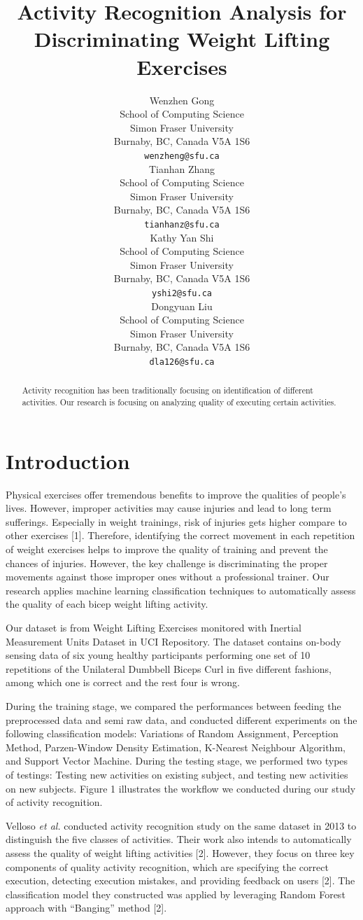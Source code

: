 \documentclass{article} %
\title{Activity Recognition Analysis for Discriminating Weight Lifting Exercises}
\author{
Wenzhen Gong \\
School of Computing Science\\
Simon Fraser University\\
Burnaby, BC, Canada V5A 1S6 \\
\texttt{wenzheng@sfu.ca} \\
\And
Tianhan Zhang \\
School of Computing Science\\
Simon Fraser University\\
Burnaby, BC, Canada V5A 1S6 \\
\texttt{tianhanz@sfu.ca} \\
\AND
Kathy Yan Shi \\
School of Computing Science\\
Simon Fraser University\\
Burnaby, BC, Canada V5A 1S6 \\
\texttt{yshi2@sfu.ca} \\
\And
Dongyuan Liu \\
School of Computing Science\\
Simon Fraser University\\
Burnaby, BC, Canada V5A 1S6 \\
\texttt{dla126@sfu.ca} \\
}
\begin{document}
\maketitle

\begin{abstract}
Activity recognition has been traditionally focusing on identification of different activities. Our research is focusing on analyzing quality of executing certain activities.
\end{abstract}

\section{Introduction}

Physical exercises offer tremendous benefits to improve the qualities of people’s lives. However, improper activities may cause injuries and lead to long term sufferings. Especially in weight trainings, risk of injuries gets higher compare to other exercises [1]. Therefore, identifying the correct movement in each repetition of weight exercises helps to improve the quality of training and prevent the chances of injuries. However, the key challenge is discriminating the proper movements against those improper ones without a professional trainer. Our research applies machine learning classification techniques to automatically assess the quality of each bicep weight lifting activity.

Our dataset is from Weight Lifting Exercises monitored with Inertial Measurement Units Dataset in UCI Repository. The dataset contains on-body sensing data of six young healthy participants performing one set of 10 repetitions of the Unilateral Dumbbell Biceps Curl in five different fashions, among which one is correct and the rest four is wrong.

During the training stage, we compared the performances between feeding the preprocessed data and semi raw data, and conducted different experiments on the following classification models: Variations of Random Assignment, Perception Method, Parzen-Window Density Estimation, K-Nearest Neighbour Algorithm, and Support Vector Machine. During the testing stage, we performed two types of testings: Testing new activities on existing subject, and testing new activities on new subjects. Figure 1 illustrates the workflow we conducted during our study of activity recognition.

Velloso \textit{et al.} conducted activity recognition study on the same dataset in 2013 to distinguish the five classes of activities. Their work also intends to automatically assess the quality of weight lifting activities [2]. However, they focus on three key components of quality activity recognition, which are specifying the correct execution, detecting execution mistakes, and providing feedback on users [2]. The classification model they constructed was applied by leveraging Random Forest approach with  “Banging” method [2].
\end{document}
